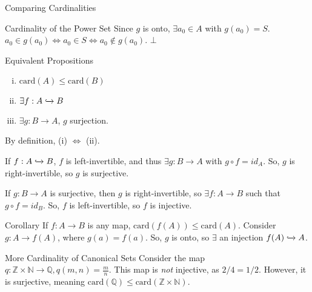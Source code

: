 \documentclass[10pt]{extarticle}
\begin{document}
\begin{problem}{Comparing Cardinalities}
\begin{problem}{Cardinality of the Power Set}
      Since $g$ is onto, $\exists a_0\in A$ with $g(a_0) = S$. $a_0 \in g(a_0) \Leftrightarrow a_0\in S \Leftrightarrow a_0\notin g(a_0)$. $\bot$
    \end{problem}
    \begin{problem}{Equivalent Propositions}
      \begin{enumerate}[(i)]
        \item $\text{card}(A) \leq \text{card}(B)$
        \item $\exists f: A\xhookrightarrow{} B$
        \item $\exists g: B\rightarrow A$, $g$ surjection.
      \end{enumerate}
      \tcblower
      By definition, (i) $\Leftrightarrow$ (ii).
      \begin{description}[font=\normalfont]
        \item[(ii) $\Rightarrow$ (iii)] If $f: A\xhookrightarrow{} B$, $f$ is left-invertible, and thus $\exists g: B\rightarrow A$ with $g\circ f = id_A$. So, $g$ is right-invertible, so $g$ is surjective.
        \item[(iii) $\Rightarrow$ (ii)] If $g: B \rightarrow A$ is surjective, then $g$ is right-invertible, so $\exists f: A\rightarrow B$ such that $g\circ f = id_B$. So, $f$ is left-invertible, so $f$ is injective.
      \end{description}
    \end{problem}
    \begin{problem}{Corollary}
      If $f: A\rightarrow B$ is any map, $\text{card}(f(A)) \leq \text{card}(A)$.
      \tcblower
      Consider $g: A\rightarrow f(A)$, where $g(a) = f(a)$. So, $g$ is onto, so $\exists$ an injection $f(A) \xhookrightarrow{} A$.
    \end{problem}
    \begin{problem}{More Cardinality of Canonical Sets}
      Consider the map $q: \mathbb{Z} \times \mathbb{N} \rightarrow \mathbb{Q}, q(m,n) = \frac{m}{n}$. This map is \textsl{not} injective, as $2/4 = 1/2$. However, it is surjective, meaning $\text{card}(\mathbb{Q}) \leq \text{card}(\mathbb{Z} \times \mathbb{N})$.\\


\end{problem}
\end{problem}
\end{document}
